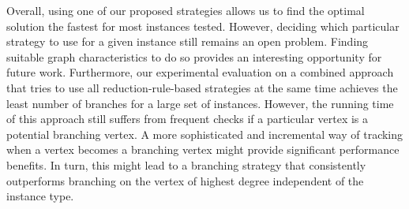 \documentclass[a4paper,UKenglish,cleveref, autoref, thm-restate]{lipics-v2021}
\begin{document}
Overall, using one of our proposed strategies allows us to find the optimal solution the fastest for most instances tested.
However, deciding which particular strategy to use for a given instance still remains an open problem.
Finding suitable graph characteristics to do so provides an interesting opportunity for future work.
Furthermore, our experimental evaluation on a combined approach that tries to use all reduction-rule-based strategies at the same time achieves the least number of branches for a large set of instances.
However, the running time of this approach still suffers from frequent checks if a particular vertex is a potential branching vertex.
A more sophisticated and incremental way of tracking when a vertex becomes a branching vertex might provide significant performance benefits.
In turn, this might lead to a branching strategy that consistently outperforms branching on the vertex of highest degree independent of the instance type.

\FloatBarrier
\newpage




\newpage

\appendix
\end{document}
